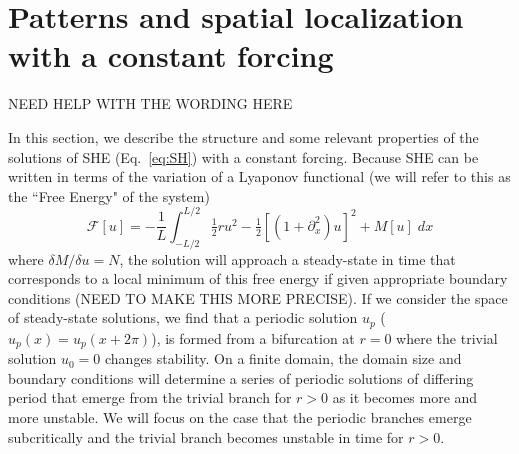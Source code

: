 \documentclass[../main/TimeForcingSHE.tex]{subfiles}
\begin{document}
\section{Patterns and spatial localization with a constant forcing }
NEED HELP WITH THE WORDING HERE

In this section, we describe the structure and some relevant properties of the  solutions of SHE (Eq.~\ref{eq:SH}) with a constant forcing.   Because SHE can be written in terms of the variation of a Lyaponov functional (we will refer to this as the ``Free Energy" of the system)
\begin{equation}
\mathcal{F}[u]=-\frac{1}{L}\int_{-L/2}^{L/2}\tfrac{1}{2}r u^2-\tfrac{1}{2}\left[(1+\partial_x^2)u\right]^2+M[u] \;dx
\end{equation}
where $\delta M/\delta u=N$, the solution will approach a steady-state in time that corresponds to a local minimum of this free energy if given appropriate boundary conditions (NEED TO MAKE THIS MORE PRECISE).  If we consider the space of steady-state solutions, we find that a periodic solution $u_p$ ($u_p(x)=u_p(x+2\pi)$), is formed from a bifurcation at $r=0$ where the trivial solution $u_0=0$ changes stability.  On a finite domain, the domain size and boundary conditions will determine a series of periodic solutions of differing period that emerge from the trivial branch for $r>0$ as it becomes more and more unstable.   We will focus on the case that the periodic branches  emerge subcritically and the trivial branch becomes unstable in time for $r>0$.  
\end{document}
